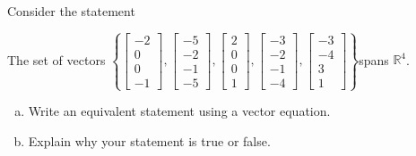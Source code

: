 
\begin{exerciseStatement}


Consider the statement 
\begin{center}\begin{minipage}{0.8\textwidth}
 The set of vectors \( \left\{ \left[\begin{array}{c}
-2 \\
0 \\
0 \\
-1
\end{array}\right] , \left[\begin{array}{c}
-5 \\
-2 \\
-1 \\
-5
\end{array}\right] , \left[\begin{array}{c}
2 \\
0 \\
0 \\
1
\end{array}\right] , \left[\begin{array}{c}
-3 \\
-2 \\
-1 \\
-4
\end{array}\right] , \left[\begin{array}{c}
-3 \\
-4 \\
3 \\
1
\end{array}\right] \right\} \)spans \(\mathbb{R}^4\). 
\end{minipage}\end{center}
    


\begin{enumerate}[(a)]
\item  Write an equivalent statement using a vector equation.
\item  Explain why your statement is true or false.
\end{enumerate}
    
\end{exerciseStatement}
    
